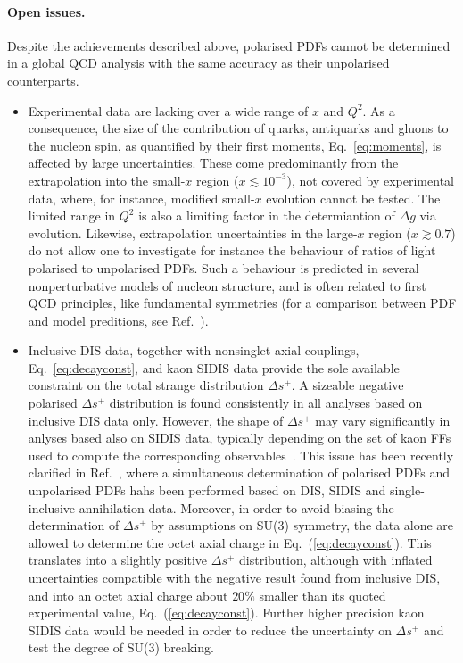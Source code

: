 \paragraph{Open issues.}

Despite the achievements described above, polarised PDFs cannot be determined 
in a global QCD analysis with the same accuracy as their unpolarised 
counterparts.

\begin{itemize}

\item Experimental data are lacking over a wide range of $x$ and $Q^2$.
%
As a consequence, the size of the contribution of quarks, antiquarks and 
gluons to the nucleon spin, as quantified by their first moments, 
Eq.~\eqref{eq:moments}, is affected by large uncertainties. 
%
These come predominantly from the extrapolation into the small-$x$ region 
($x\lesssim 10^{-3}$), not covered by experimental data, where, for
instance, modified small-$x$ evolution cannot be tested.
%
The limited range in $Q^2$ is also a limiting factor in the determiantion
of $\Delta g$ via evolution.
%
Likewise, extrapolation uncertainties in the large-$x$ region
($x\gtrsim 0.7$) do not allow one to investigate for instance
the behaviour of ratios of light polarised to unpolarised PDFs.
%
Such a behaviour is predicted in several nonperturbative models
of nucleon structure, and is often related to first QCD principles,
like fundamental symmetries (for a comparison between PDF and 
model preditions, see Ref.~\cite{Nocera:2014uea}).

\item Inclusive DIS data, together with nonsinglet axial couplings, 
Eq.~\eqref{eq:decayconst}, and kaon SIDIS data provide the sole available 
constraint on the total strange distribution $\Delta s^+$.
%
A sizeable negative polarised $\Delta s^+$ distribution is found 
consistently in all analyses based on inclusive DIS data only.
%
However, the shape of $\Delta s^+$ may vary significantly in anlyses based
also on SIDIS data, typically depending on the set of kaon FFs used to compute
the corresponding observables~\cite{Leader:2011tm}.
%
This issue has been recently clarified in Ref.~\cite{Ethier:2017zbq},
where a simultaneous determination of polarised PDFs and unpolarised PDFs
hahs been performed based on DIS, SIDIS and single-inclusive annihilation data.
%
Moreover, in order to avoid biasing the determination of $\Delta s^+$ by 
assumptions on SU(3) symmetry, the data alone are allowed to determine the 
octet axial charge in Eq.~(\ref{eq:decayconst}).
%
This translates into a slightly positive $\Delta s^+$ distribution,
although with inflated uncertainties compatible with the negative result 
found from inclusive DIS, and into an octet axial charge about $20\%$ 
smaller than its quoted experimental value, Eq.~(\ref{eq:decayconst}).
%
Further higher precision kaon SIDIS data would be needed in order to reduce 
the uncertainty on $\Delta s^+$ and test the degree of SU(3) breaking.

\end{itemize}

